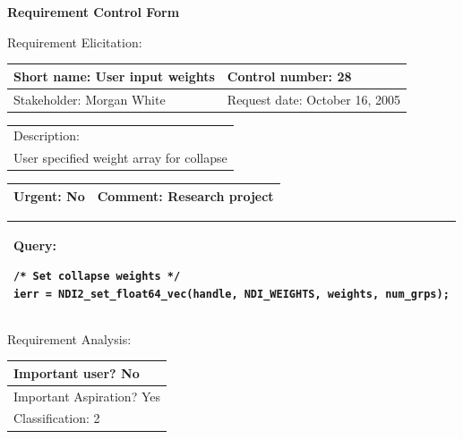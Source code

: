 \begin{center}\Large\bf
Requirement Control Form
\end{center}
\vspace{24pt}

Requirement Elicitation:

\begin{tabular}{|p{211pt}|p{211pt}|} \hline
Short name: User input weights & Control number: 28\\ \hline
Stakeholder: Morgan White & Request date: October 16, 2005\\
\end{tabular}
\begin{tabular}{|p{433pt}|} \hline
Description: \\ 
User specified weight array for collapse \\
\hline
\end{tabular} 
\begin{tabular}{|p{211pt}|p{211pt}|} \hline
Urgent: No & Comment: Research project\\ \hline
\end{tabular}

\vspace{12pt}

\begin{tabular}{|p{433pt}|} \hline
Query: 
\begin{verbatim}
/* Set collapse weights */
ierr = NDI2_set_float64_vec(handle, NDI_WEIGHTS, weights, num_grps);
\end{verbatim}\\ \hline
\end{tabular}
\vspace{24pt}

Requirement Analysis:

\begin{tabular}{|p{433pt}|} \hline
Important user? No \\ \hline
Important Aspiration? Yes \\ \hline
Classification: 2 \\ \hline
\end{tabular}
\vspace{24pt}

